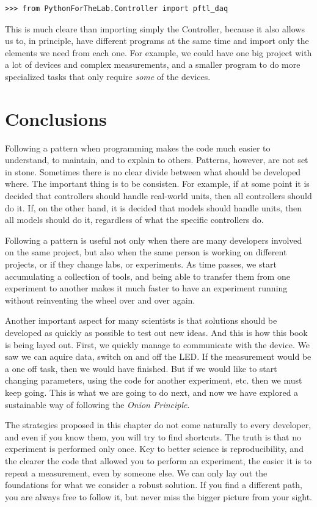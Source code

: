 \begin{verbatim}
>>> from PythonForTheLab.Controller import pftl_daq
\end{verbatim}

This is much cleare than importing simply the Controller, because it also allows us to, in principle, have different programs at the same time and import only the elements we need from each one. For example, we could have one big project with a lot of devices and complex measurements, and a smaller program to do more specialized tasks that only require \emph{some} of the devices.

\section{Conclusions}\label{section:layout-conclusions}
Following a pattern when programming makes the code much easier to understand, to maintain, and to explain to others. Patterns, however, are not set in stone. Sometimes there is no clear divide between what should be developed where. The important thing is to be consisten. For example, if at some point it is decided that controllers should handle real-world units, then all controllers should do it. If, on the other hand, it is decided that models should handle units, then all models should do it, regardless of what the specific controllers do.

Following a pattern is useful not only when there are many developers involved on the same project, but also when the same person is working on different projects, or if they change labs, or experiments. As time passes, we start accumulating a collection of tools, and being able to transfer them from one experiment to another makes it much faster to have an experiment running without reinventing the wheel over and over again.

Another important aspect for many scientists is that solutions should be developed as quickly as possible to test out new ideas. And this is how this book is being layed out. First, we quickly manage to communicate with the device. We saw we can aquire data, switch on and off the LED. If the measurement would be a one off task, then we would have finished. But if we would like to start changing parameters, using the code for another experiment, etc. then we must keep going. This is what we are going to do next, and now we have explored a sustainable way of following the \emph{Onion Principle}.

The strategies proposed in this chapter do not come naturally to every developer, and even if you know them, you will try to find shortcuts. The truth is that no experiment is performed only once. Key to better science is reproducibility, and the clearer the code that allowed you to perform an experiment, the easier it is to repeat a measurement, even by someone else. We can only lay out the foundations for what we consider a robust solution. If you find a different path, you are always free to follow it, but never miss the bigger picture from your sight.

